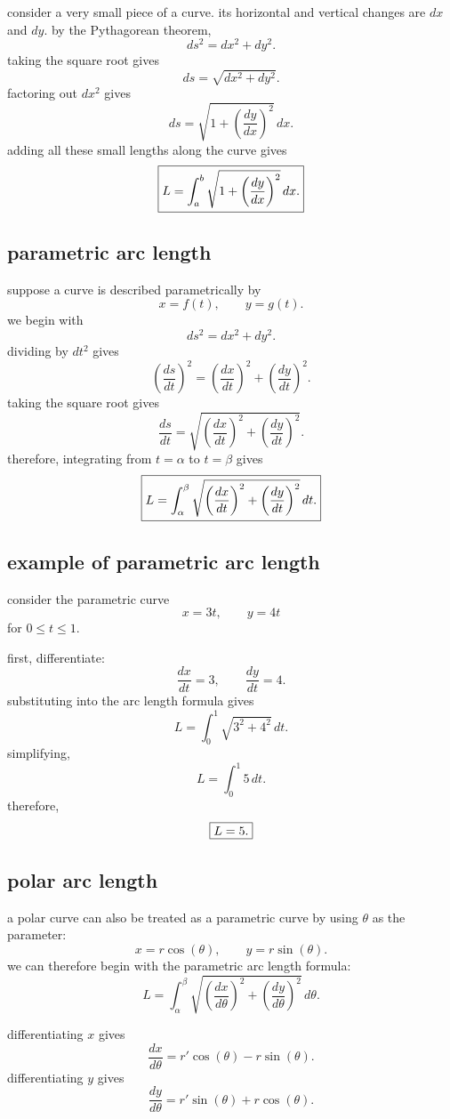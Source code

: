 \documentclass{article}
\newcommand{\mybox}[1]{\fbox{\ensuremath{\displaystyle #1}}}
\begin{document}
consider a very small piece of a curve. its horizontal and vertical changes are $dx$ and $dy$. by the Pythagorean theorem,
\[
ds^2=dx^2+dy^2.
\]
taking the square root gives
\[
ds=\sqrt{dx^2+dy^2}.
\]
factoring out $dx^2$ gives
\[
ds=
\sqrt{
1+\left(\frac{dy}{dx}\right)^2
}\,dx.
\]
adding all these small lengths along the curve gives
\[
\mybox{
L=\int_a^b
\sqrt{
1+\left(\frac{dy}{dx}\right)^2
}\,dx.
}
\]

\subsection{parametric arc length}

suppose a curve is described parametrically by
\[
x=f(t),\qquad y=g(t).
\]
we begin with
\[
ds^2=dx^2+dy^2.
\]
dividing by $dt^2$ gives
\[
\left(\frac{ds}{dt}\right)^2
=
\left(\frac{dx}{dt}\right)^2+
\left(\frac{dy}{dt}\right)^2.
\]
taking the square root gives
\[
\frac{ds}{dt}
=
\sqrt{
\left(\frac{dx}{dt}\right)^2+
\left(\frac{dy}{dt}\right)^2
}.
\]
therefore, integrating from $t=\alpha$ to $t=\beta$ gives
\[
\mybox{
L=
\int_\alpha^\beta
\sqrt{
\left(\frac{dx}{dt}\right)^2+
\left(\frac{dy}{dt}\right)^2
}\,dt.
}
\]

\subsection{example of parametric arc length}

consider the parametric curve
\[
x=3t,\qquad y=4t
\]
for $0\leq t\leq1$.

first, differentiate:
\[
\frac{dx}{dt}=3,\qquad
\frac{dy}{dt}=4.
\]
substituting into the arc length formula gives
\[
L=\int_0^1\sqrt{3^2+4^2}\,dt.
\]
simplifying,
\[
L=\int_0^1 5\,dt.
\]
therefore,
\[
\mybox{L=5.}
\]

\subsection{polar arc length}

a polar curve can also be treated as a parametric curve by using $\theta$ as the parameter:
\[
x=r\cos(\theta),\qquad
y=r\sin(\theta).
\]
we can therefore begin with the parametric arc length formula:
\[
L=
\int_\alpha^\beta
\sqrt{
\left(\frac{dx}{d\theta}\right)^2+
\left(\frac{dy}{d\theta}\right)^2
}\,d\theta.
\]

differentiating $x$ gives
\[
\frac{dx}{d\theta}
=
r'\cos(\theta)-r\sin(\theta).
\]
differentiating $y$ gives
\[
\frac{dy}{d\theta}
=
r'\sin(\theta)+r\cos(\theta).
\]
\end{document}
